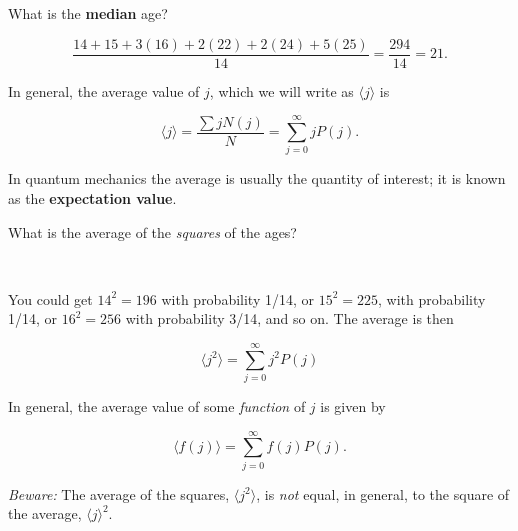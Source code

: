 \documentclass[svgnames]{article}   	%
\begin{document}
\begin{tcolorbox}[colback = blue!5!white, colframe = blue!50!black, title
= Question]
What is the \textbf{median} age?
\end{tcolorbox} 

\begin{tcolorbox}[colback = red!5!white, colframe = red!50!black, title
= Solution]
\[
\frac{14 + 15 + 3(16) + 2(22) + 2(24) + 5(25)}{14} = \frac{294}{14} = 21.
\]

\end{tcolorbox}

\vspace{5px}
In general, the average value of $j$, which we will write as $\langle
j \rangle$ is 

\vspace{5px} \[
  \langle j \rangle = \frac{\sum j N(j)}{N} = \sum_{j=0}^{\infty} j P(j). 
\] \vspace{5px}

In quantum mechanics the average is usually the quantity of interest; it is
known as the \textbf{expectation value}. \\[0.5cm]

\begin{tcolorbox}[colback = blue!5!white, colframe = blue!50!black, title
= Question]
What is the average of the \textit{squares} of the ages? 
\end{tcolorbox} \

\begin{tcolorbox}[colback = red!5!white, colframe = red!50!black, title
= Solution]
You could get $14^2 = 196$ with probability 1/14, or $15^2 = 225$, with
probability 1/14, or $16^2 = 256$ with probability 3/14, and so on. The average
is then 

\[
  \langle j^2 \rangle = \sum_{j=0}^{\infty} j^2 P(j) 
\]

\end{tcolorbox} \vspace{5px}

In general, the average value of some \textit{function} of $j$ is given by
\vspace{5px}
\begin{tcolorbox}	
 \[ 
  \langle f(j) \rangle = \sum_{j=0}^{\infty} f(j)P(j). 
  \]
\end{tcolorbox}	

\vspace{5px}

\textit{Beware:} The average of the squares, $\langle j^2 \rangle$, is
\textit{not} equal, in general, to the square of the average, $\langle
j \rangle ^2$. 
\vspace{5px}
\end{document}
